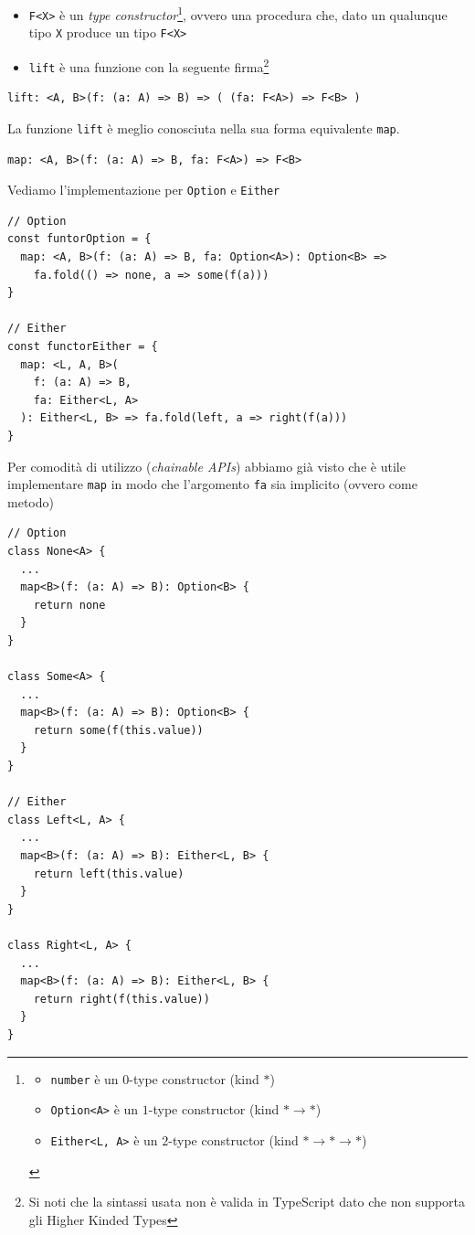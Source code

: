 \documentclass[12pt]{article}
\begin{document}
\begin{itemize}
  \item \texttt{F<X>} è un \emph{type constructor}\footnote{
    \begin{itemize}
      \item \texttt{number} è un $0$-type constructor (kind $*$)
      \item \texttt{Option<A>} è un $1$-type constructor (kind $* \rightarrow *$)
      \item \texttt{Either<L, A>} è un $2$-type constructor (kind $* \rightarrow * \rightarrow *$)
    \end{itemize}
  }, ovvero una procedura che, dato un qualunque tipo \texttt{X} produce un tipo \texttt{F<X>}
  \item \texttt{lift} è una funzione con la seguente firma\footnote{Si noti che la sintassi usata non è valida in TypeScript dato che non supporta gli Higher Kinded Types}
\end{itemize}

\begin{verbatim}
lift: <A, B>(f: (a: A) => B) => ( (fa: F<A>) => F<B> )
\end{verbatim}

La funzione \texttt{lift} è meglio conosciuta nella sua forma equivalente \texttt{map}.

\begin{verbatim}
map: <A, B>(f: (a: A) => B, fa: F<A>) => F<B>
\end{verbatim}

Vediamo l'implementazione per \texttt{Option} e \texttt{Either}

\begin{verbatim}
// Option
const funtorOption = {
  map: <A, B>(f: (a: A) => B, fa: Option<A>): Option<B> =>
    fa.fold(() => none, a => some(f(a)))
}

// Either
const functorEither = {
  map: <L, A, B>(
    f: (a: A) => B,
    fa: Either<L, A>
  ): Either<L, B> => fa.fold(left, a => right(f(a)))
}
\end{verbatim}

Per comodità di utilizzo (\emph{chainable APIs}) abbiamo già visto che è utile implementare \texttt{map} in modo che
l'argomento \texttt{fa} sia implicito (ovvero come metodo)

\begin{verbatim}
// Option
class None<A> {
  ...
  map<B>(f: (a: A) => B): Option<B> {
    return none
  }
}

class Some<A> {
  ...
  map<B>(f: (a: A) => B): Option<B> {
    return some(f(this.value))
  }
}

// Either
class Left<L, A> {
  ...
  map<B>(f: (a: A) => B): Either<L, B> {
    return left(this.value)
  }
}

class Right<L, A> {
  ...
  map<B>(f: (a: A) => B): Either<L, B> {
    return right(f(this.value))
  }
}
\end{verbatim}
\end{document}
